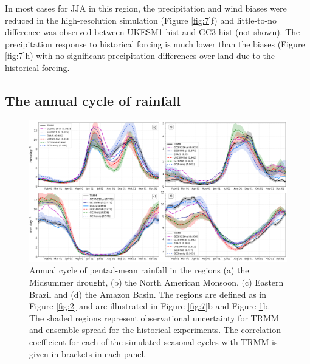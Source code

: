 In most cases for JJA in this region, the precipitation and wind biases were reduced in the high-resolution simulation (Figure \ref{fig:7}f) and little-to-no difference was observed between UKESM1-hist and GC3-hist (not shown).
The precipitation response to historical forcing is much lower than the biases (Figure \ref{fig:7}h) with no significant precipitation differences over land due to the historical forcing. %
 

\subsection{The annual cycle of rainfall}\label{sq:raincycle}

\begin{figure}[b!]
\centering
 \includegraphics[width=1.0\linewidth]{figures/amipseasonalcycle.png}
\caption[Annual cycle of precipitation in different regions of the AMS]{Annual cycle of pentad-mean rainfall in the regions (a) the Midsummer drought, (b) the North American Monsoon, (c) Eastern Brazil and (d) the Amazon Basin. The regions are defined as in Figure \ref{fig:2} and are illustrated in Figure \ref{fig:7}b and Figure \ref{fig:8}b. The shaded regions represent observational uncertainty for TRMM and ensemble spread for the historical experiments. The correlation coefficient for each of the simulated seasonal cycles with TRMM is given in brackets in each panel.  }
\label{fig:8}
\end{figure}



